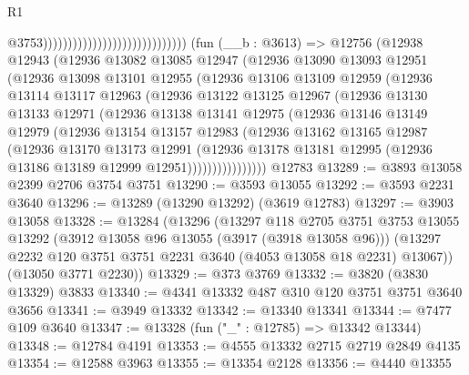 \begin{lexlean}{R1}
\begin{coremodule}
                                                              @3753)))))))))))))))))))))))))))))
    (fun (__b : @3613) =>
    @12756
      (@12938
        @12943
        (@12936
          @13082
          @13085
          @12947
          (@12936
            @13090
            @13093
            @12951
            (@12936
              @13098
              @13101
              @12955
              (@12936
                @13106
                @13109
                @12959
                (@12936
                  @13114
                  @13117
                  @12963
                  (@12936
                    @13122
                    @13125
                    @12967
                    (@12936
                      @13130
                      @13133
                      @12971
                      (@12936
                        @13138
                        @13141
                        @12975
                        (@12936
                          @13146
                          @13149
                          @12979
                          (@12936
                            @13154
                            @13157
                            @12983
                            (@12936
                              @13162
                              @13165
                              @12987
                              (@12936
                                @13170
                                @13173
                                @12991
                                (@12936
                                  @13178
                                  @13181
                                  @12995
                                  (@12936 @13186 @13189 @12999 @12951))))))))))))))))
    @12783
@13289 := @3893 @13058 @2399 @2706 @3754 @3751
@13290 := @3593 @13055
@13292 := @3593 @2231 @3640
@13296 := @13289 (@13290 @13292) (@3619 @12783)
@13297 := @3903 @13058
@13328 := @13284
    (@13296
      (@13297
        @118
        @2705
        @3751
        @3753
        @13055
        @13292
        (@3912 @13058 @96 @13055 (@3917 (@3918 @13058 @96)))
        (@13297 @2232 @120 @3751 @3751 @2231 @3640 (@4053 @13058 @18 @2231) @13067))
      (@13050 @3771 @2230))
@13329 := @373 @3769
@13332 := @3820 (@3830 @13329) @3833
@13340 := @4341 @13332 @487 @310 @120 @3751 @3751 @3640 @3656
@13341 := @3949 @13332
@13342 := @13340 @13341
@13344 := @7477 @109 @3640
@13347 := @13328 (fun ("_" : @12785) => @13342 @13344)
@13348 := @12784 @4191
@13353 := @4555 @13332 @2715 @2719 @2849 @4135
@13354 := @12588 @3963
@13355 := @13354 @2128
@13356 := @4440 @13355

\end{coremodule}
\end{lexlean}
